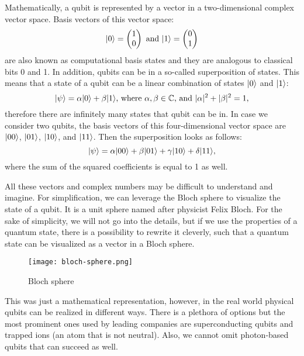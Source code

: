 Mathematically, a qubit is represented by a vector in a two-dimensional complex vector space. Basis vectors of this vector space:
\begin{equation*}
\lvert0\rangle = \begin{pmatrix} 1 \\ 0 \end{pmatrix}\text{ and }\lvert1\rangle = \begin{pmatrix} 0 \\ 1 \end{pmatrix}
\end{equation*}
are also known as computational basis states and they are analogous to classical bits 0 and 1. In addition, qubits can be in a so-called superposition of states. This means that a state of a qubit can be a linear combination of states $\lvert0\rangle$ and $\lvert1\rangle$:
\begin{equation*}
\lvert\psi\rangle = \alpha \lvert0\rangle + \beta \lvert1\rangle\text{, where } \alpha,\beta \in \mathbb{C}\text{, and } \lvert \alpha \rvert^2 + \lvert \beta \rvert^2 = 1\text{,}
\end{equation*}
therefore there are infinitely many states that qubit can be in. In case we consider two qubits, the basis vectors of this four-dimensional vector space are $\lvert00\rangle$, $\lvert01\rangle$, $\lvert10\rangle$, and $\lvert11\rangle$. Then the superposition looks as follows:
\begin{equation*}
 \lvert\psi\rangle = \alpha \lvert00\rangle + \beta \lvert01\rangle + \gamma \lvert10\rangle + \delta \lvert11\rangle\text{,}
\end{equation*}
where the sum of the squared coefficients is equal to 1 as well. 

All these vectors and complex numbers may be difficult to understand and imagine. For simplification, we can leverage the Bloch sphere to visualize the state of a qubit. It is a unit sphere named after physicist Felix Bloch. For the sake of simplicity, we will not go into the details, but if we use the properties of a quantum state, there is a possibility to rewrite it cleverly, such that a quantum state can be visualized as a vector in a Bloch sphere.

\begin{figure}[H]
    \begin{center}
       \texttt{[image: bloch-sphere.png]}
       \caption{Bloch sphere \cite{img:bloch_sphere}}
    \end{center}
\end{figure} 

This was just a mathematical representation, however, in the real world physical qubits can be realized in different ways. There is a plethora of options but the most prominent ones used by leading companies are superconducting qubits and trapped ions (an atom that is not neutral). Also, we cannot omit photon-based qubits that can succeed as well.  

